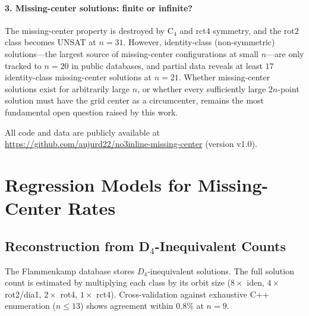 \documentclass[11pt,a4paper]{article}
\theoremstyle{plain}
\theoremstyle{definition}
\begin{document}
\paragraph{3. Missing-center solutions: finite or infinite?}
The missing-center property is destroyed by C$_4$ and rct4 symmetry, and the rot2 class becomes UNSAT at $n=31$. However, identity-class (non-symmetric) solutions---the largest source of missing-center configurations at small $n$---are only tracked to $n=20$ in public databases, and partial data reveals at least $17$ identity-class missing-center solutions at $n=21$. Whether missing-center solutions exist for arbitrarily large $n$, or whether every sufficiently large $2n$-point solution must have the grid center as a circumcenter, remains the most fundamental open question raised by this work.

All code and data are publicly available at \url{https://github.com/aujurd22/no3inline-missing-center} (version v1.0).

\appendix
\section{Regression Models for Missing-Center Rates}
\label{app:regression}

\subsection{Reconstruction from D$_4$-Inequivalent Counts}

The Flammenkamp database stores $D_4$-inequivalent solutions. The full solution count is estimated by multiplying each class by its orbit size ($8\times$ iden, $4\times$ rot2/dia1, $2\times$ rot4, $1\times$ rct4). Cross-validation against exhaustive C++ enumeration ($n\le13$) shows agreement within $0.8\%$ at $n=9$.
\end{document}
